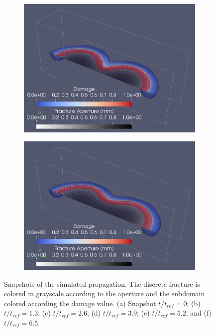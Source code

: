 \begin{figure}[h]
\begin{subfigure}{.45\textwidth}
  \centering
  \includegraphics[width=\linewidth]{Chapter4/figures/merging/merging_t_42.png}
  \caption{}
  \label{fig:merge_t_4}
\end{subfigure}
\hspace{0.85cm}
\begin{subfigure}{.45\textwidth}
  \centering
  \includegraphics[width=\linewidth]{Chapter4/figures/merging/merging_t_67.png}
  \caption{}
  \label{fig:merge_t_5}
\end{subfigure}
  \caption{Snapshots of the simulated propagation. The discrete fracture is colored in grayscale according to the aperture and the subdomain colored according the damage value. (a) Snapshot $t/t_{ref} = 0$; (b) $t/t_{ref} = 1.3$; (c) $t/t_{ref} = 2.6$; (d) $t/t_{ref} = 3.9$; (e) $t/t_{ref} = 5.2$; and (f) $t/t_{ref} = 6.5$. } 
  \label{fig:merge_snapshots}  
\end{figure}

\FloatBarrier


